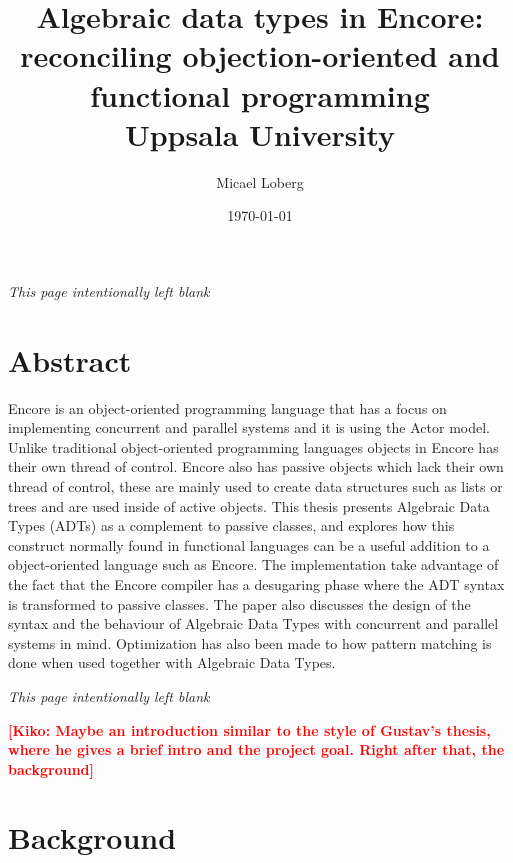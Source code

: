 \documentclass[10pt]{report}
\title{
    {Algebraic data types in Encore:}\\
    {reconciling objection-oriented and functional programming}\\
    {Uppsala University}
}
\author{Micael Loberg}
\date{\today}
\newcommand{\KIKO}[1]{\textcolor{red}{\textbf{[Kiko: #1]}}}
\begin{document}

\maketitle

\newpage\newpage
{\centering \textit{This page intentionally left blank}\par}
\vspace{\fill}


\chapter*{Abstract}
\par{Encore is an object-oriented programming language that has a focus on implementing concurrent and parallel systems and it is using the Actor model. Unlike traditional object-oriented programming languages objects in Encore has their own thread of control. Encore also has passive objects which lack their own thread of control, these are mainly used to create data structures such as lists or trees and are used inside of active objects. This thesis presents Algebraic Data Types (ADTs) as a complement to passive classes, and explores how this construct normally found in functional languages can be a useful addition to a object-oriented language such as Encore. The implementation take advantage of the fact that the Encore compiler has a desugaring phase where the ADT syntax is transformed to passive classes. The paper also discusses the design of the syntax and the behaviour of Algebraic Data Types with concurrent and parallel systems in mind. Optimization has also been made to how pattern matching is done when used together with Algebraic Data Types.}

\newpage\newpage
{\centering \textit{This page intentionally left blank}\par}
\vspace{\fill}


\tableofcontents

\KIKO{Maybe an introduction similar to the style of Gustav's thesis, where
he gives a brief intro and the project goal. Right after that, the background}

%
\chapter{Background}
%
\setcounter{page}{1}
\end{document}
